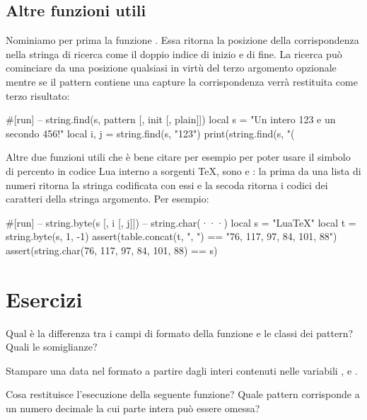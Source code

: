 \subsection{Altre funzioni utili}

Nominiamo per prima la funzione . Essa
ritorna la posizione della corrispondenza nella stringa di ricerca come il
doppio indice di inizio e di fine. La ricerca può cominciare da una posizione
qualsiasi in virtù del terzo argomento opzionale mentre se il pattern contiene
una capture la corrispondenza verrà restituita come terzo risultato:
\begin{lines}
#[run]
-- string.find(s, pattern [, init [, plain]])
local s = "Un intero 123 e un secondo 456!"
local i, j = string.find(s, "123")
print(string.find(s, "(%
\end{lines}

Altre due funzioni utili che è bene citare per esempio per poter usare il
simbolo di percento in codice Lua interno a sorgenti \TeX{}, sono
 e : la
prima da una lista di numeri ritorna la stringa codificata con essi e la secoda
ritorna i codici dei caratteri della stringa argomento.
Per esempio:
\begin{lines}
#[run]
-- string.byte(s [, i [, j]])
-- string.char(···)
local s = "LuaTeX"
local t = {string.byte(s, 1, -1)}
assert(table.concat(t, ", ") == "76, 117, 97, 84, 101, 88")
assert(string.char(76, 117, 97, 84, 101, 88) == s)
\end{lines}


\section{Esercizi}

\begin{Exercise}[label=libstd-01]
Qual è la differenza tra i campi di formato della funzione  e
le classi dei pattern? Quali le somiglianze?
\end{Exercise}

\begin{Exercise}[label=libstd-02]
Stampare una data nel formato  a partire dagli interi contenuti
nelle variabili ,  e .
\end{Exercise}

\begin{Exercise}[label=libstd-03]
Cosa restituisce l'esecuzione della seguente funzione?
Quale pattern corrisponde a un numero decimale la cui parte intera può essere
omessa?
\end{Exercise}

